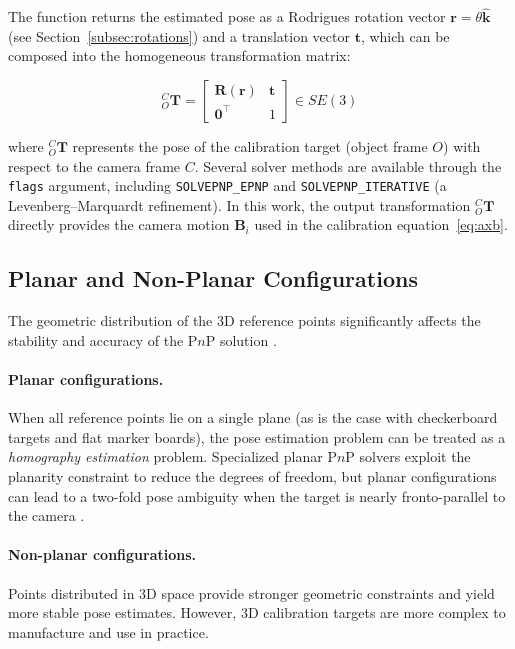 \noindent The function returns the estimated pose as a Rodrigues rotation vector
$\mathbf{r} = \theta\hat{\mathbf{k}}$ (see Section~\ref{subsec:rotations}) and a
translation vector $\mathbf{t}$, which can be composed into the homogeneous
transformation matrix:

\begin{equation}
    {}^C_O\mathbf{T} =
    \begin{bmatrix}
        \mathbf{R}(\mathbf{r}) & \mathbf{t} \\
        \mathbf{0}^{\top} & 1
    \end{bmatrix} \in SE(3)
    \label{eq:pnp_output}
\end{equation}

\noindent where ${}^C_O\mathbf{T}$ represents the pose of the calibration target
(object frame $O$) with respect to the camera frame $C$. Several solver methods
are available through the \texttt{flags} argument, including \texttt{SOLVEPNP\_EPNP}
\cite{lepetit2009epnp} and \texttt{SOLVEPNP\_ITERATIVE} (a Levenberg--Marquardt
refinement). In this work, the output transformation ${}^C_O\mathbf{T}$ directly
provides the camera motion $\mathbf{B}_i$ used in the calibration
equation~\eqref{eq:axb}.

\subsection{Planar and Non-Planar Configurations}
\label{subsec:planar}

The geometric distribution of the 3D reference points significantly affects the
stability and accuracy of the P$n$P solution \cite{hartley2004multiple}.

\paragraph{Planar configurations.} When all reference points lie on a single plane
(as is the case with checkerboard targets and flat marker boards), the pose
estimation problem can be treated as a \textit{homography estimation} problem.
Specialized planar P$n$P solvers exploit the planarity constraint to reduce the
degrees of freedom, but planar configurations can lead to a two-fold pose ambiguity
when the target is nearly fronto-parallel to the camera \cite{zhang2000flexible}.

\paragraph{Non-planar configurations.} Points distributed in 3D space provide
stronger geometric constraints and yield more stable pose estimates. However,
3D calibration targets are more complex to manufacture and use in practice.

